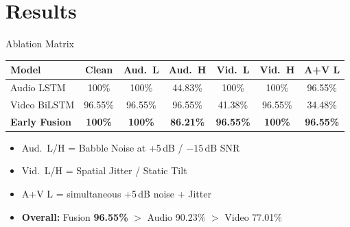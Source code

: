 \documentclass{beamer}
\begin{document}
\section{Results}

\begin{frame}[shrink=5]{Ablation Matrix}
  \begin{center}
    \footnotesize
    \begin{tabular}{lcccccc}
      \toprule
      \textbf{Model}        & \textbf{Clean} & \textbf{Aud.\ L} & \textbf{Aud.\ H} & \textbf{Vid.\ L} & \textbf{Vid.\ H} & \textbf{A+V L}   \\
      \midrule
      Audio LSTM            & 100\%          & 100\%            & 44.83\%          & 100\%            & 100\%            & 96.55\%          \\
      Video BiLSTM          & 96.55\%        & 96.55\%          & 96.55\%          & 41.38\%          & 96.55\%          & 34.48\%          \\
      \textbf{Early Fusion} & \textbf{100\%} & \textbf{100\%}   & \textbf{86.21\%} & \textbf{96.55\%} & \textbf{100\%}   & \textbf{96.55\%} \\
      \bottomrule
    \end{tabular}
  \end{center}
  \vspace{0.4em}
  \begin{itemize}
    \item Aud.\ L/H = Babble Noise at +5\,dB / $-15$\,dB SNR
    \item Vid.\ L/H = Spatial Jitter / Static Tilt
    \item A+V L = simultaneous +5\,dB noise + Jitter
    \item \textbf{Overall:} Fusion \textbf{96.55\%} $>$ Audio 90.23\% $>$ Video 77.01\%
  \end{itemize}
\end{frame}
\end{document}
